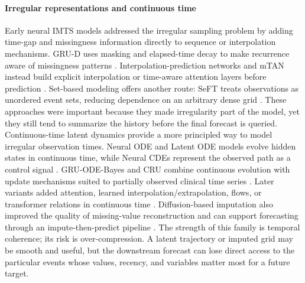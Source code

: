 \documentclass[preprint,12pt]{elsarticle}
\begin{document}
\paragraph{Irregular representations and continuous time}
Early neural IMTS models addressed the irregular sampling problem by adding
time-gap and missingness information directly to sequence or interpolation
mechanisms. GRU-D uses masking and elapsed-time decay to make recurrence aware
of missingness patterns \citep{grud}. Interpolation-prediction networks and
mTAN instead build explicit interpolation or time-aware attention layers before
prediction \citep{shukla2019interp,mtan}. Set-based modeling offers another
route: SeFT treats observations as unordered event sets, reducing dependence on
an arbitrary dense grid \citep{seft}. These approaches were important because
they made irregularity part of the model, yet they still tend to summarize the
history before the final forecast is queried. Continuous-time latent dynamics provide a more principled way to model
irregular observation times. Neural ODE and Latent ODE models evolve hidden
states in continuous time, while Neural CDEs represent the observed path as a
control signal \citep{neuralode2,latentODE,neuralCDE}. GRU-ODE-Bayes and CRU
combine continuous evolution with update mechanisms suited to partially
observed clinical time series \citep{DeBrouwer2019GRUODE,cru}. Later variants
added attention, learned interpolation/extrapolation, flows, or transformer
relations in continuous time \citep{ANCDE2021,EXIT2022,neuralflows2,ContiFormer2023}.
Diffusion-based imputation also improved the quality of missing-value
reconstruction and can support forecasting through an impute-then-predict
pipeline \citep{CSDI2021}. The strength of this family is temporal coherence;
its risk is over-compression. A latent trajectory or imputed grid may be smooth
and useful, but the downstream forecast can lose direct access to the particular
events whose values, recency, and variables matter most for a future target.
\end{document}
